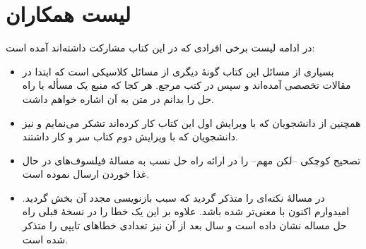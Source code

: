\documentclass{book}
\begin{document}
\section*{لیست همکاران}

در ادامه لیست برخی افرادی که در این کتاب مشارکت داشته‌اند آمده است:

\begin{itemize}

\item    
    بسیاری از مسائل این کتاب گونه‌ٔ دیگری از مسائل کلاسیکی است که ابتدا در مقالات تخصصی آمده‌اند و سپس در کتب مرجع. 
    هر کجا که منبع یک مسأله یا راه حل را بدانم در متن به آن اشاره خواهم داشت. 

\item 
    همچنین از دانشجویان  که با ویرایش اول این کتاب کار کرده‌اند تشکر می‌نمایم و نیز دانشجویان 
    که با ویرایش دوم کتاب سر و کار داشتند. 

\item 
    تصحیح کوچکی --لکن مهم-- را در ارائه راه حل  نسب به مسالهٔ فیلسوف‌های در حال غذا خوردن ارسال نموده است. 

\item {}
    در مسالهٔ  نکته‌ای را متذکر گردید که سبب بازنویسی مجدد آن بخش گردید. امیدوارم اکنون با معنی‌تر شده باشد. 
    علاوه بر این  یک خطا را در نسخهٔ قبلی راه حل مساله  نشان داده است و سال بعد از آن نیز 
    تعدادی خطاهای تایپی را متذکر شده است. 
    

\end{itemize}
\end{document}
